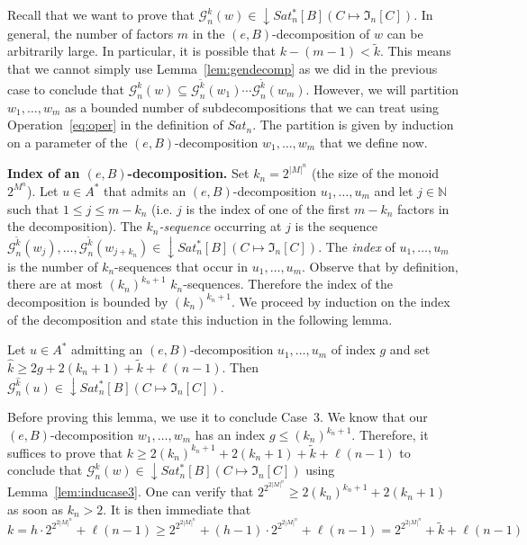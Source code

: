 \documentclass[envcountsame]{llncs}
\newcommand\nat{\ensuremath{\mathbb{N}}\xspace}
\newcommand\Gs{\ensuremath{\mathcal{G}}\xspace}
\let\leq\leqslant
\let\geq\geqslant
\newcommand\fI{\ensuremath{\mathfrak I}\xspace}
\DeclareMathOperator{\downclos}{\downarrow}
\begin{document}
Recall that we want to prove that $\Gs_n^k(w) \in \downclos
Sat^{*}_n[B](C \mapsto \fI_n[C])$. In general, the number of factors
$m$ in the $(e,B)$-decomposition of $w$ can be arbitrarily large. In
particular, it is possible that $k - (m-1) < \widetilde{k}$. This
means that we cannot simply use Lemma~\ref{lem:gendecomp} as we did in
the previous case to conclude that $\Gs_n^k(w) \subseteq
\Gs_n^{\widetilde{k}}(w_{1}) \cdots
\Gs_n^{\widetilde{k}}(w_{m})$. However, we will partition $w_1,\dots,w_m$ 
as a bounded number of subdecompositions that we can treat using
Operation~\eqref{eq:oper} in the definition of $Sat_n$. The partition
is given by induction on a parameter of the $(e,B)$-decomposition
$w_1,\dots,w_m$ that we define now.

\medskip
\noindent
{\bf Index of an $(e,B)$-decomposition.} Set $k_n = 2^{|M|^n}$ (the
size of the monoid $2^{M^n}$). Let $u \in A^*$ that admits an
$(e,B)$-decomposition $u_1,\dots,u_{m}$ and let $j \in \nat$ such that $1
\leq j \leq m - k_n$ (i.e. $j$ is the index of one of the first $m -
k_n$ factors in the decomposition). The \emph{$k_n$-sequence} occurring
at $j$ is the sequence $\Gs_n^{\tilde{k}}(w_j),\dots,
\Gs_n^{\tilde{k}}(w_{j+k_n}) \in \downclos Sat^{*}_n[B](C \mapsto
\fI_n[C])$. The \emph{index} of $u_1,\dots,u_{m}$ is the number of
$k_n$-sequences that occur in $u_1,\dots,u_{m}$. Observe that by
definition, there are at most $(k_n)^{k_n+1}$
$k_n$-sequences. Therefore the index of the decomposition is bounded
by $(k_n)^{k_n+1}$. We proceed by induction on the index of the
decomposition and state this induction in the following lemma.


\begin{lemma} \label{lem:inducase3}
  Let $u \in A^*$ admitting an $(e,B)$-decomposition $u_1,\dots,u_m$ of
  index $g$ and set $\widehat{k} \geq 2g + 2(k_n+1) + \widetilde{k} +
  \ell(n-1)$. Then $\Gs_n^{\widehat{k}}(u) \in \downclos Sat^{*}_n[B](C \mapsto \fI_n[C])$.
\end{lemma}

Before proving this lemma, we use it to conclude Case~3. We know that our
$(e,B)$-decomposition $w_1,\dots,w_m$ has an index $g \leq
(k_n)^{k_n+1}$. Therefore, it suffices to prove that $k \geq
2(k_n)^{k_n+1} + 2(k_n+1) + \widetilde{k} + \ell(n-1)$ to conclude that
$\Gs_n^k(w) \in \downclos Sat^{*}_n[B](C \mapsto \fI_n[C])$ using
Lemma~\ref{lem:inducase3}. One can verify that $2^{2^{2|M|^n}} \geq
2(k_n)^{k_n+1} + 2(k_n+1)$ as soon as $k_n>2$. It is then immediate that
\[
k = h \cdot 2^{2^{2|M|^n}} + \ell(n-1) \geq 2^{2^{2|M|^n}} + (h-1) \cdot
2^{2^{2|M|^n}} + \ell(n-1) = 2^{2^{2|M|^n}} + \widetilde{k} + \ell(n-1)
\]
\end{document}
